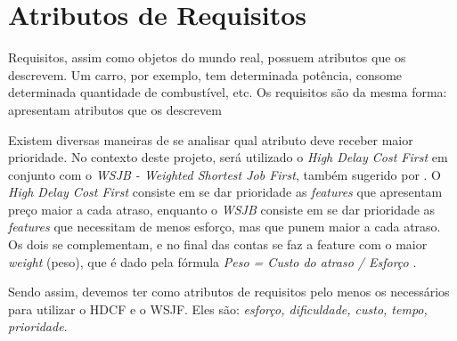 \section{Atributos de Requisitos}
Requisitos, assim como objetos do mundo real, possuem atributos que os descrevem. Um carro, por exemplo, tem determinada potência, consome determinada quantidade de combustível, etc. Os requisitos são da mesma forma: apresentam atributos que os descrevem \cite{tel006}

Existem diversas maneiras de se analisar qual atributo deve receber maior prioridade. No contexto deste projeto, será utilizado o \emph{High Delay Cost First} em conjunto com o \emph{WSJB - Weighted Shortest Job First}, também sugerido por \cite{safe001}. O \emph{High Delay Cost First} consiste em se dar prioridade as \emph{features} que apresentam preço maior a cada atraso, enquanto o \emph{WSJB} consiste em se dar prioridade as \emph{features} que necessitam de menos esforço, mas que punem maior a cada atraso. Os dois se complementam, e no final das contas se faz a feature com o maior \emph{weight} (peso), que é dado pela fórmula \emph{Peso = Custo do atraso / Esforço} \cite[p. 266]{safe001}.

Sendo assim, devemos ter como atributos de requisitos pelo menos os necessários para utilizar o HDCF e o WSJF. Eles são: \emph{esforço, dificuldade, custo, tempo, prioridade}.

